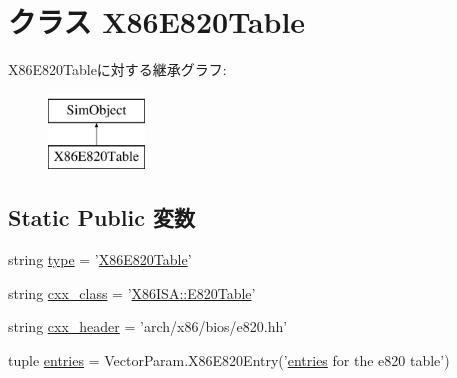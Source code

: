 \hypertarget{classE820_1_1X86E820Table}{
\section{クラス X86E820Table}
\label{classE820_1_1X86E820Table}
}
X86E820Tableに対する継承グラフ:\begin{figure}[H]
\begin{center}
\leavevmode
\includegraphics[height=2cm]{classE820_1_1X86E820Table}
\end{center}
\end{figure}
\subsection*{Static Public 変数}
\begin{DoxyCompactItemize}
\item 
string \hyperlink{classE820_1_1X86E820Table_acce15679d830831b0bbe8ebc2a60b2ca}{type} = '\hyperlink{classE820_1_1X86E820Table}{X86E820Table}'
\item 
string \hyperlink{classE820_1_1X86E820Table_a58cd55cd4023648e138237cfc0822ae3}{cxx\_\-class} = '\hyperlink{classX86ISA_1_1E820Table}{X86ISA::E820Table}'
\item 
string \hyperlink{classE820_1_1X86E820Table_a17da7064bc5c518791f0c891eff05fda}{cxx\_\-header} = 'arch/x86/bios/e820.hh'
\item 
tuple \hyperlink{classE820_1_1X86E820Table_aa7b3bf5cf82e2cb9b7cea7a35c454576}{entries} = VectorParam.X86E820Entry('\hyperlink{classE820_1_1X86E820Table_aa7b3bf5cf82e2cb9b7cea7a35c454576}{entries} for the e820 table')
\end{DoxyCompactItemize}


